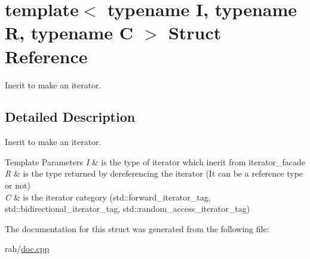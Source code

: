 \hypertarget{structtemplate_3_01typename_01_i_00_01typename_01_r_00_01typename_01_c_01_4}{}\section{template$<$ typename I, typename R, typename C $>$ Struct Reference}
\label{structtemplate_3_01typename_01_i_00_01typename_01_r_00_01typename_01_c_01_4}


Inerit to make an iterator.  




\subsection{Detailed Description}
Inerit to make an iterator. 


\begin{DoxyTemplParams}{Template Parameters}
{\em I} & is the type of iterator which inerit from iterator\+\_\+facade \\
\hline
{\em R} & is the type returned by dereferencing the iterator (It can be a reference type or not) \\
\hline
{\em C} & is the iterator category (std\+::forward\+\_\+iterator\+\_\+tag, std\+::bidirectional\+\_\+iterator\+\_\+tag, std\+::random\+\_\+access\+\_\+iterator\+\_\+tag) \\
\hline
\end{DoxyTemplParams}


The documentation for this struct was generated from the following file\+:\begin{DoxyCompactItemize}
\item 
rah/\mbox{\hyperlink{doc_8cpp}{doc.\+cpp}}\end{DoxyCompactItemize}
